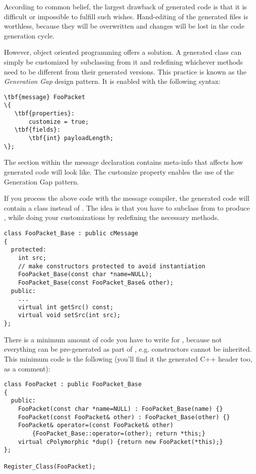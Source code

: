 According to common belief, the largest drawback of generated code
is that it is difficult or impossible to fulfill such wishes.
Hand-editing of the generated files is worthless, because
they will be overwritten and changes will be lost
in the code generation cycle.

However, object oriented programming offers a solution.
A generated class can simply be customized by subclassing
from it and redefining whichever methods need to be
different from their generated versions. This practice
is known as the \textit{Generation Gap} design pattern.
It is enabled with the following syntax:

\begin{Verbatim}[commandchars=\\\{\}]
\tbf{message} FooPacket
\{
   \tbf{properties}:
       customize = true;
   \tbf{fields}:
       \tbf{int} payloadLength;
\};
\end{Verbatim}

The  section within the message declaration contains
meta-info that affects how generated code will look like.
The customize property enables the use of the Generation Gap
pattern.

If you process the above code with the message compiler,
the generated code will contain a  class
instead of . The idea is that you have
to subclass from  to produce
, while doing your customizations
by redefining the necessary methods.

\begin{verbatim}
class FooPacket_Base : public cMessage
{
  protected:
    int src;
    // make constructors protected to avoid instantiation
    FooPacket_Base(const char *name=NULL);
    FooPacket_Base(const FooPacket_Base& other);
  public:
    ...
    virtual int getSrc() const;
    virtual void setSrc(int src);
};
\end{verbatim}

There is a minimum amount of code you have to write
for , because not everything can be
pre-generated as part of , e.g.
constructors cannot be inherited. This minimum
code is the following (you'll find it the generated C++ header
too, as a comment):

\begin{verbatim}
class FooPacket : public FooPacket_Base
{
  public:
    FooPacket(const char *name=NULL) : FooPacket_Base(name) {}
    FooPacket(const FooPacket& other) : FooPacket_Base(other) {}
    FooPacket& operator=(const FooPacket& other)
        {FooPacket_Base::operator=(other); return *this;}
    virtual cPolymorphic *dup() {return new FooPacket(*this);}
};

Register_Class(FooPacket);
\end{verbatim}

